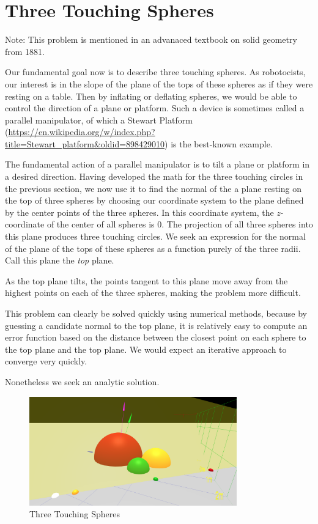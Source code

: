 \documentclass{article}
\begin{document}
\section{Three Touching Spheres}

Note: This problem is mentioned in an advanaced textbook on solid geometry from 1881\cite{payne1881}.

Our fundamental goal now is to describe three touching spheres. As robotocists,
our interest is in the slope of the plane of the tops of these spheres
as if they were resting on a table. Then by inflating or deflating spheres,
we would be able to control the direction of a plane or platform.
Such a device is sometimes called a parallel manipulator, of which a
Stewart Platform\cite{wiki:stewart} (\url{https://en.wikipedia.org/w/index.php?title=Stewart_platform&oldid=898429010})
is the best-known example.

The fundamental action of a parallel manipulator is to tilt a plane or platform in a desired direction.
Having developed the math for the three touching circles in the previous section, we now use it
to find the normal of the a plane resting on the top of three spheres by choosing our
coordinate system to the plane defined by the center points of the three spheres.
In this coordinate system, the $z$-coordinate of the center of all spheres is $0$.
The projection of all three spheres into this plane produces three touching circles.
We seek an expression for the normal of the plane of the tops of these spheres as a function
purely of the three radii. Call this plane the {\em top} plane.

As the top plane tilts, the points tangent to this plane move away from the highest points on each of
the three spheres, making the problem more difficult.

This problem can clearly be solved quickly using numerical methods, because by guessing
a candidate normal to the top plane, it is relatively easy to compute an error function based
on the distance between the closest point on each sphere to the top plane and the top plane.
We would expect an iterative approach to converge very quickly.

Nonetheless we seek an analytic solution.

\begin{figure}
     \centering
     \includegraphics[width=0.80\textwidth]{figures/StandardThreeSphereDiagram.png}
     \caption{Three Touching Spheres}
  \label{fig:fixed}
\end{figure}
\end{document}
